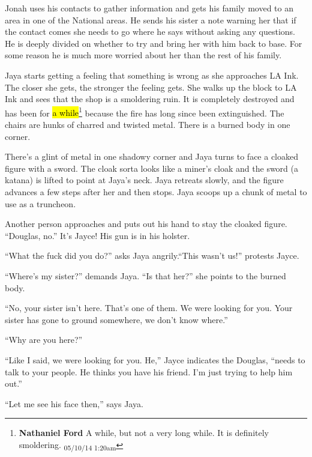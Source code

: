 
Jonah uses his contacts to gather information and gets his family moved to an area in one of the National areas.  He sends his sister a note warning her that if the contact comes she needs to go where he says without asking any questions.  He is deeply divided on whether to try and bring her with him back to base.  For some reason he is much more worried about her than the rest of his family.



Jaya starts getting a feeling that something is wrong as she approaches LA Ink.  The closer she gets, the stronger the feeling gets.  She walks up the block to LA Ink and sees that the shop is a smoldering ruin.  It is completely destroyed and has been for \hl{a while}\footnote{\textbf{Nathaniel Ford }A while, but not a very long while. It is definitely smoldering. \textsubscript{05/10/14 1:20am}} because the fire has long since been extinguished.  The chairs are hunks of charred and twisted metal.  There is a burned body in one corner.



There's a glint of metal in one shadowy corner and Jaya turns to face a cloaked figure with a sword.  The cloak sorta looks like a miner's cloak and the sword (a katana) is lifted to point at Jaya's neck.  Jaya retreats slowly, and the figure advances a few steps after her and then stops.  Jaya scoops up a chunk of metal to use as a truncheon.



Another person approaches and puts out his hand to stay the cloaked figure.  ``Douglas, no.''  It's Jayce!  His gun is in his holster.

``What the fuck did you do?'' asks Jaya angrily.``This wasn't us!'' protests Jayce.

``Where's my sister?'' demands Jaya. ``Is that her?'' she points to the burned body.

``No, your sister isn't here.  That's one of them.  We were looking for you.  Your sister has gone to ground somewhere, we don't know where.''

``Why are you here?''

``Like I said, we were looking for you.  He,'' Jayce indicates the Douglas, ``needs to talk to your people.  He thinks you have his friend.  I'm just trying to help him out.''

``Let me see his face then,'' says Jaya.

